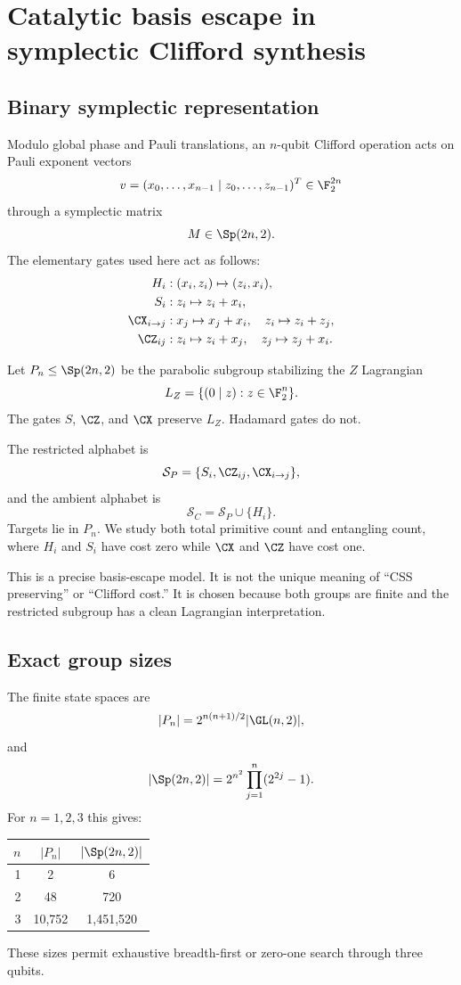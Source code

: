 \chapter{Catalytic basis escape in symplectic Clifford synthesis}\label{ch:clifford}


\section{Binary symplectic representation}
Modulo global phase and Pauli translations, an $n$-qubit Clifford operation acts on Pauli exponent vectors
\[
v=(x_0,\ldots,x_{n-1}\mid z_0,\ldots,z_{n-1})^T\in\F_2^{2n}
\]
through a symplectic matrix
\[
M\in\Sp(2n,2).
\]
The elementary gates used here act as follows:
\begin{align*}
H_i &: (x_i,z_i)\mapsto(z_i,x_i),\\
S_i &: z_i\mapsto z_i+x_i,\\
\CX_{i\to j} &: x_j\mapsto x_j+x_i,
\quad z_i\mapsto z_i+z_j,\\
\CZ_{ij} &: z_i\mapsto z_i+x_j,
\quad z_j\mapsto z_j+x_i.
\end{align*}

Let $P_n\le\Sp(2n,2)$ be the parabolic subgroup stabilizing the $Z$ Lagrangian
\[
L_Z=\{(0\mid z):z\in\F_2^n\}.
\]
The gates $S$, $\CZ$, and $\CX$ preserve $L_Z$.  Hadamard gates do not.

\begin{definition}
The restricted alphabet is
\[
\mathcal S_P
=
\{S_i,\CZ_{ij},\CX_{i\to j}\},
\]
and the ambient alphabet is
\[
\mathcal S_C
=
\mathcal S_P\cup\{H_i\}.
\]
Targets lie in $P_n$.  We study both total primitive count and entangling count, where $H_i$ and $S_i$ have cost zero while $\CX$ and $\CZ$ have cost one.
\end{definition}

This is a precise basis-escape model.  It is not the unique meaning of ``CSS preserving'' or ``Clifford cost.''  It is chosen because both groups are finite and the restricted subgroup has a clean Lagrangian interpretation.

\section{Exact group sizes}
The finite state spaces are
\[
|P_n|
=
2^{n(n+1)/2}|\GL(n,2)|,
\]
and
\[
|\Sp(2n,2)|
=
2^{n^2}\prod_{j=1}^n(2^{2j}-1).
\]
For $n=1,2,3$ this gives:
\begin{center}
\begin{tabular}{@{}rcc@{}}
\toprule
$n$&$|P_n|$&$|\Sp(2n,2)|$\\
\midrule
1&2&6\\
2&48&720\\
3&10,752&1,451,520\\
\bottomrule
\end{tabular}
\end{center}
These sizes permit exhaustive breadth-first or zero-one search through three qubits.

